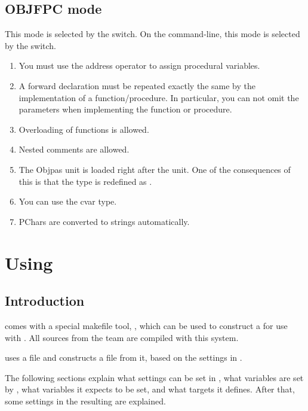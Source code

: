 \section{OBJFPC mode}
This mode is selected by the  switch. On the command-line,
this mode is selected by the  switch.
\begin{enumerate}
\item You must use the address operator to assign procedural variables.
\item A forward declaration must be repeated exactly the same by the
implementation of a function/procedure. In particular, you can not omit the
parameters when implementing the function or procedure.
\item Overloading of functions is allowed.
\item Nested comments are allowed.
\item The Objpas unit is loaded right after the  unit. One of the
consequences of this is that the type  is redefined as
.
\item You can use the cvar type.
\item PChars are converted to strings automatically.
\end{enumerate}


\chapter{Using }
\label{ch:makefile}
\newcommand{\mvar}[1]{\var{\$(#1)}}
\section{Introduction}
\fpc comes with a special makefile tool, , which can be
used to construct a  for use with \gnu {}.
All sources from the \fpc team are compiled with this system.

 uses a file  and constructs a file
 from it, based on the settings in .

The following sections explain what settings can be set in ,
what variables are set by , what variables it expects to be set,
and what targets it defines. After that, some settings in the resulting
 are explained.

